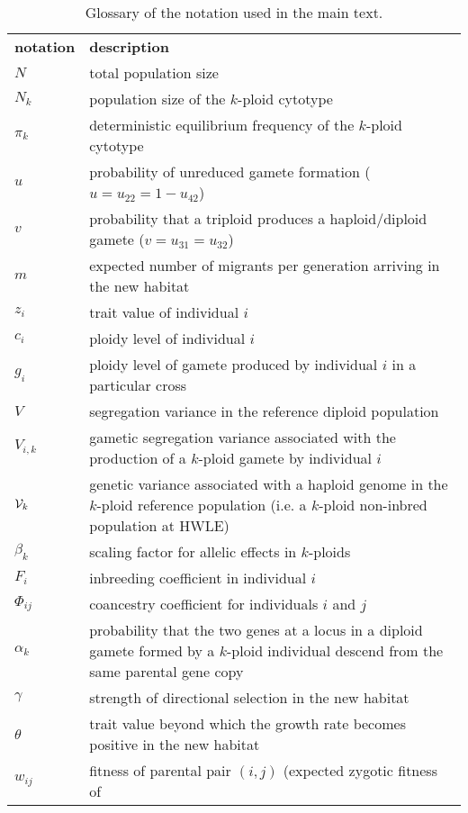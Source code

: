 \documentclass[12pt,a4paper]{article}
\begin{document}
    \begin{table}[t]
    \caption{Glossary of the notation used in the main text.
    } \label{tbl:glossary}
    \centering
    \small
    \begin{tabularx}{\linewidth}{lX}
    \cline{1-2}
    \textbf{notation}   & \textbf{description}   \\ \cline{1-2}
    $N$ & total population size\\
    $N_k$ & population size of the $k$-ploid cytotype \\
    $\pi_k$ & deterministic equilibrium frequency of the $k$-ploid cytotype \\
    $u$ & probability of unreduced gamete formation ($u=u_{22}=1-u_{42}$)\\
    $v$ & probability that a triploid produces a haploid/diploid gamete
      ($v=u_{31}=u_{32}$)\\
    $m$ & expected number of migrants per generation arriving in the new habitat \\
    $z_i$ & trait value of individual $i$ \\
    $c_i$ & ploidy level of individual $i$ \\
    $g_i$ & ploidy level of gamete produced by individual $i$ in a particular cross\\
    $V$ & segregation variance in the reference diploid population \\
    $V_{i,k}$ & gametic segregation variance associated with the production of a
      $k$-ploid gamete by individual $i$ \\
    $\mathcal{V}_k$ & genetic variance associated with a haploid genome in the $k$-ploid
      reference population (i.e. a $k$-ploid non-inbred population at HWLE) \\
    $\beta_{k}$ & scaling factor for allelic effects in $k$-ploids \\
    $F_i$ & inbreeding coefficient in individual $i$ \\
    $\Phi_{ij}$ & coancestry coefficient for individuals $i$ and $j$ \\
    $\alpha_k$ & probability that the two genes at a locus in a diploid gamete
      formed by a $k$-ploid individual descend from the same parental gene copy\\
    $\gamma$ & strength of directional selection in the new habitat\\
    $\theta$ & trait value beyond which the growth rate becomes positive in the new
        habitat \\ 
    $w_{ij}$ & fitness of parental pair $(i,j)$ (expected zygotic fitness of

\end{tabularx}
\end{table}
\end{document}
